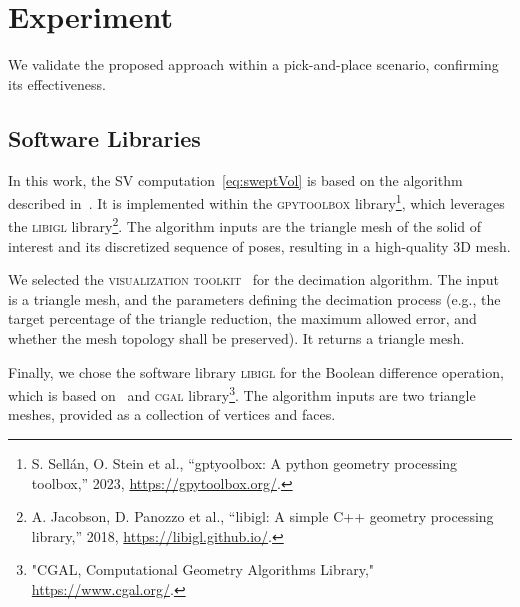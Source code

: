 \section{Experiment}
\label{sec:experiments}
\noindent We validate the proposed approach within a pick-and-place scenario, confirming its effectiveness.

\subsection{Software Libraries}
In this work, 
the SV computation~\eqref{eq:sweptVol} is based on the algorithm described in~\cite{sellan2021swept}.
It is implemented within the \textsc{gpytoolbox} 
library\footnote{S. Sellán, O. Stein et al., “gptyoolbox: 
	A python geometry processing toolbox,” 2023, \url{https://gpytoolbox.org/}.}, 
which leverages the \textsc{libigl} 
library\footnote{A. Jacobson, D. Panozzo et al., “libigl: 
	A simple C++ geometry processing library,” 2018, \url{https://libigl.github.io/}.}.
The algorithm inputs are the triangle mesh of the solid of interest and its discretized sequence of poses,
resulting in a high-quality 3D mesh.

We selected the \textsc{visualization toolkit}~\cite{vtkBook} for the decimation algorithm.
The input is a triangle mesh, 
and the parameters defining the decimation process 
(e.g., the target percentage of the triangle reduction, 
the maximum allowed error, and whether the mesh topology shall be preserved).
It returns a triangle mesh.

Finally, 
we chose the software library \textsc{libigl} 
for the Boolean difference operation, 
which is based on~\cite{zhou2016mesh} and 
\textsc{cgal} library\footnote{"CGAL, Computational Geometry Algorithms Library," \url{https://www.cgal.org/}.}.
The algorithm inputs are two triangle meshes, %
provided as a collection of vertices and faces.

